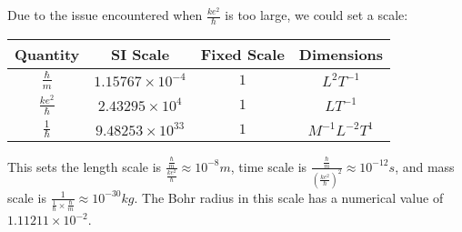 \documentclass{article}
\begin{document}
\pagebreak

Due to the issue encountered when $\frac{ke^2}{\hbar}$ is too large, we could set a scale:
\begin{center}
\begin{tabular}{||c c c c||} 
 \hline
 Quantity & SI Scale & Fixed Scale & Dimensions \\ 
 \hline
 $\frac{\hbar}{m}$ & $1.15767\times10^{-4}$& $1$ & $L^2T^{-1}$ \\
 \hline
 $\frac{ke^2}{\hbar}$ & $2.43295\times10^{4}$ & $1$ & $LT^{-1}$ \\ 
 \hline
 $\frac{1}{\hbar}$ & $9.48253\times10^{33}$ & $1$ & $M^{-1}L^{-2}T^{1}$ \\ 
\hline
\end{tabular}
\end{center}
This sets the length scale is $\frac{\frac{\hbar}{m}}{\frac{ke^2}{\hbar}}\approx 10^{-8}m$, time scale is $\frac{\frac{\hbar}{m}}{\left(\frac{ke^2}{\hbar}\right)^2}\approx 10^{-12}s$, and mass scale is $\frac{1}{\frac{1}{\hbar}\times\frac{\hbar}{m}}\approx 10^{-30}kg$. The Bohr radius in this scale has a numerical value of $1.11211\times10^{-2}$.
\end{document}
